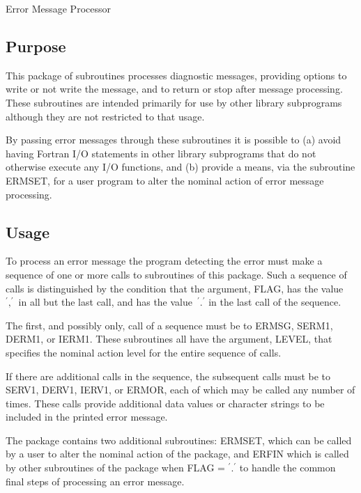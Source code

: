 \documentclass[twoside]{MATH77}
\begin{document}
  Error Message Processor


\subsection{Purpose}

This package of subroutines processes diagnostic messages, providing options
to write or not write the message, and to return or stop after message
processing. These subroutines are intended primarily for use by other
library subprograms although they are not restricted to that usage.

By passing error messages through these subroutines it is possible to (a)
avoid having Fortran I/O statements in other library subprograms that do
not otherwise execute any I/O functions, and (b) provide a means, via
the subroutine ERMSET, for a user program to alter the nominal action of
error message processing.

\subsection{Usage}

To process an error message the program detecting the error must make
a sequence of one or more calls to subroutines of this package. Such
a sequence of calls is distinguished by the condition that the
argument, FLAG, has the value~$^{\prime },^{\prime }$ in all but the
last call, and has the value~$^{\prime }.^{\prime }$ in the last call
of the sequence.

The first, and possibly only, call of a sequence must be to ERMSG, SERM1,
DERM1, or IERM1.  These subroutines all have the argument, LEVEL, that
specifies the nominal action level for the entire sequence of calls.

If there are additional calls in the sequence, the subsequent calls must
be to SERV1, DERV1, IERV1, or ERMOR, each of which may be called any
number of times.  These calls provide additional data values or character
strings to be included in the printed error message.

The package contains two additional subroutines: ERMSET, which can be called
by a user to alter the nominal action of the package, and ERFIN which is
called by other subroutines of the package when FLAG = $^{\prime}.^{\prime}$
to handle the common final steps of processing an error message.
\end{document}
